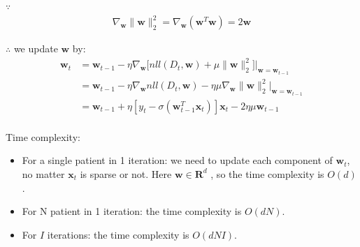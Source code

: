 \documentclass[12pt]{article}
\begin{document}
$\because$
\begin{equation}
\begin{aligned}
\nabla_\mathbf{w}\|\mathbf{w}\|_2^2 = \nabla_\mathbf{w}(\mathbf{w}^T \mathbf{w}) = 2 \mathbf{w}
\end{aligned} 
\end{equation}

$\therefore$ we update $\mathbf{w}$ by:
\begin{equation}
\begin{aligned}
\mathbf{w}_{t}
& =  \mathbf{w}_{t-1} - \eta \nabla_\mathbf{w}\bigg[ nll\left (D_t, \mathbf{w} \right ) + \mu \|\mathbf{w}\|_2^2 \bigg]
\bigg|_{\mathbf{w} = \mathbf{w}_{t-1} } \\
& =  \mathbf{w}_{t-1} - \eta \nabla_\mathbf{w} nll\left (D_t, \mathbf{w} \right ) - \eta  \mu \nabla_\mathbf{w}\|\mathbf{w}\|_2^2 
\bigg|_{\mathbf{w} = \mathbf{w}_{t-1} } \\
& = \mathbf{w}_{t-1}
+ \eta \left [ 
y_t - \sigma(\mathbf{w}_{t-1}^T\mathbf{x}_t)
\right ]\mathbf{x}_t
- 2 \eta \mu \mathbf{w}_{t-1}\\
\end{aligned} 
\end{equation}

Time complexity:
\begin{itemize}
\item For a single patient in 1 iteration: we need to update each component of $\mathbf{w}_t$, no matter $\mathbf{x}_t$ is sparse or not. Here $\mathbf{w} \in \mathbf{R}^d$ , so the time complexity is $O(d)$.

\item For N patient in 1 iteration: the time complexity is $O(d N)$.

\item For $I$ iterations: the time complexity is $O(d N I)$.\\

\end{itemize}



\end{document}
